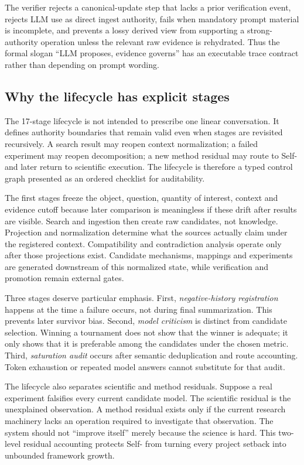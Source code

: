 The verifier rejects a canonical-update step that lacks a prior verification event, rejects LLM use as direct ingest authority, fails when mandatory prompt material is incomplete, and prevents a lossy derived view from supporting a strong-authority operation unless the relevant raw evidence is rehydrated. Thus the formal slogan ``LLM proposes, evidence governs'' has an executable trace contract rather than depending on prompt wording.

\subsection{Why the lifecycle has explicit stages}

The 17-stage lifecycle is not intended to prescribe one linear conversation. It defines authority boundaries that remain valid even when stages are revisited recursively. A search result may reopen context normalization; a failed experiment may reopen decomposition; a new method residual may route to Self-\RAKL{} and later return to scientific execution. The lifecycle is therefore a typed control graph presented as an ordered checklist for auditability.

The first stages freeze the object, question, quantity of interest, context and evidence cutoff because later comparison is meaningless if these drift after results are visible. Search and ingestion then create raw candidates, not knowledge. Projection and normalization determine what the sources actually claim under the registered context. Compatibility and contradiction analysis operate only after those projections exist. Candidate mechanisms, mappings and experiments are generated downstream of this normalized state, while verification and promotion remain external gates.

Three stages deserve particular emphasis. First, \emph{negative-history registration} happens at the time a failure occurs, not during final summarization. This prevents later survivor bias. Second, \emph{model criticism} is distinct from candidate selection. Winning a tournament does not show that the winner is adequate; it only shows that it is preferable among the candidates under the chosen metric. Third, \emph{saturation audit} occurs after semantic deduplication and route accounting. Token exhaustion or repeated model answers cannot substitute for that audit.

The lifecycle also separates scientific and method residuals. Suppose a real experiment falsifies every current candidate model. The scientific residual is the unexplained observation. A method residual exists only if the current research machinery lacks an operation required to investigate that observation. The system should not ``improve itself'' merely because the science is hard. This two-level residual accounting protects Self-\RAKL{} from turning every project setback into unbounded framework growth.

